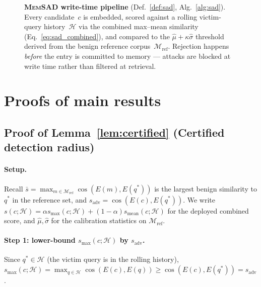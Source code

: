 \documentclass{article}
\theoremstyle{definition}
\newcommand{\cM}{\mathcal{M}}
\newcommand{\cH}{\mathcal{H}}
\newcommand{\enc}{E}
\DeclareMathOperator{\cosim}{cos}
\begin{document}
\begin{figure}[ht]
\caption{\textbf{\textsc{MemSAD} write-time pipeline} (Def.~\ref{def:sad}, Alg.~\ref{alg:sad}). Every candidate~$c$ is embedded, scored against a rolling victim-query history~$\cH$ via the combined max--mean similarity (Eq.~\ref{eq:sad_combined}), and compared to the $\hat\mu+\kappa\hat\sigma$ threshold derived from the benign reference corpus~$\cM_{\text{ref}}$. Rejection happens \emph{before} the entry is committed to memory --- attacks are blocked at write time rather than filtered at retrieval.}
\label{fig:pipeline}
\end{figure}

\section{Proofs of main results}
\label{app:proofs}

\subsection{Proof of Lemma~\ref{lem:certified} (Certified detection radius)}
\label{app:proof_certified}

\paragraph{Setup.} Recall $\bar s = \max_{m \in \cM_{\text{ref}}} \cosim(\enc(m), \enc(q^*))$ is the largest benign similarity to $q^*$ in the reference set, and $s_{\text{adv}} = \cosim(\enc(c), \enc(q^*))$. We write $s(c;\cH) = \alpha s_{\max}(c;\cH) + (1-\alpha) s_{\text{mean}}(c;\cH)$ for the deployed combined score, and $\hat\mu, \hat\sigma$ for the calibration statistics on $\cM_{\text{ref}}$.

\paragraph{Step 1: lower-bound $s_{\max}(c;\cH)$ by $s_{\text{adv}}$.} Since $q^* \in \cH$ (the victim query is in the rolling history), $s_{\max}(c;\cH) = \max_{q \in \cH} \cosim(\enc(c), \enc(q)) \geq \cosim(\enc(c), \enc(q^*)) = s_{\text{adv}}$.
\end{document}
